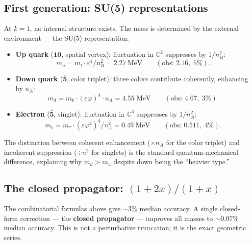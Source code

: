 \documentclass[12pt]{article}
\theoremstyle{remark}
\theoremstyle{definition}
\newcommand{\CC}{\mathbb{C}}
\begin{document}
\subsection{First generation: SU(5) representations}

At $k = 1$, no internal structure exists. The mass is determined by the external environment --- the SU(5) representation:

\begin{itemize}
\item \textbf{Up quark} ($\mathbf{10}$, spatial vertex): fluctuation in $\CC^2$ suppresses by $1/n_B^2$:
\begin{equation}
m_u = m_t \cdot \varepsilon^4 / n_B^2 = 2.27\;\text{MeV} \qquad (\text{obs: } 2.16,\; 5\%).
\end{equation}

\item \textbf{Down quark} ($\bar{\mathbf{5}}$, color triplet): three colors contribute coherently, enhancing by $n_A$:
\begin{equation}
m_d = m_b \cdot (\varepsilon\varphi)^4 \cdot n_A = 4.55\;\text{MeV} \qquad (\text{obs: } 4.67,\; 3\%).
\end{equation}

\item \textbf{Electron} ($\bar{\mathbf{5}}$, singlet): fluctuation in $\CC^3$ suppresses by $1/n_A^2$:
\begin{equation}
m_e = m_\tau \cdot (\varepsilon\varphi^2)^4 / n_A^2 = 0.49\;\text{MeV} \qquad (\text{obs: } 0.511,\; 4\%).
\end{equation}
\end{itemize}

The distinction between coherent enhancement ($\times n_A$ for the color triplet) and incoherent suppression ($\div n^2$ for singlets) is the standard quantum-mechanical difference, explaining why $m_d > m_u$ despite down being the ``heavier type.''

\subsection{The closed propagator: $(1+2x)/(1+x)$}
\label{sec:closed_propagator}

The combinatorial formulas above give $\sim 3\%$ median accuracy.  A single closed-form correction --- the \textbf{closed propagator} --- improves all masses to $\sim 0.07\%$ median accuracy.  This is not a perturbative truncation; it is the exact geometric series.
\end{document}

